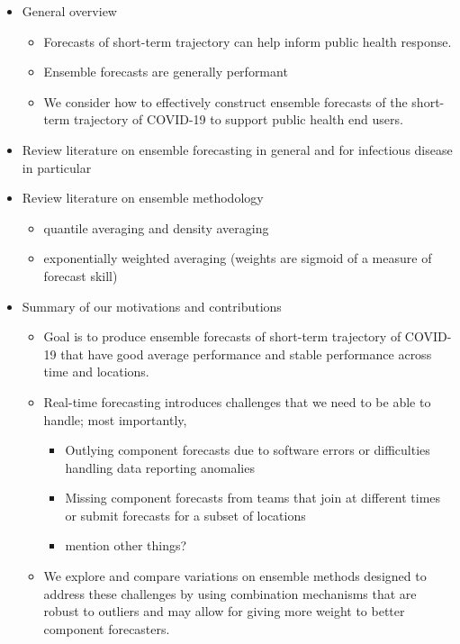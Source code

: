 \documentclass[review]{elsarticle}
\begin{document}
\begin{itemize}
  \item General overview
  \begin{itemize}
    \item Forecasts of short-term trajectory can help inform public health response.
    \item Ensemble forecasts are generally performant
    \item We consider how to effectively construct ensemble forecasts of the short-term trajectory of COVID-19 to support public health end users.
  \end{itemize}
  \item Review literature on ensemble forecasting in general and for infectious disease in particular
  \item Review literature on ensemble methodology
  \begin{itemize}
    \item quantile averaging and density averaging
    \item exponentially weighted averaging (weights are sigmoid of a measure of forecast skill)
  \end{itemize}
  \item Summary of our motivations and contributions
  \begin{itemize}
    \item Goal is to produce ensemble forecasts of short-term trajectory of COVID-19 that have good average performance and stable performance across time and locations.
    \item Real-time forecasting introduces challenges that we need to be able to handle; most importantly,
    \begin{itemize}
      \item Outlying component forecasts due to software errors or difficulties handling data reporting anomalies
      \item Missing component forecasts from teams that join at different times or submit forecasts for a subset of locations
      \item mention other things?
    \end{itemize}
    \item We explore and compare variations on ensemble methods designed to address these challenges by using combination mechanisms that are robust to outliers and may allow for giving more weight to better component forecasters.
  \end{itemize}
\end{itemize}
\end{document}
